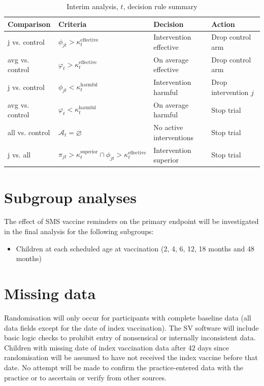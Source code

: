 \documentclass[
  bibliography=totoc]{scrreprt}
\providecommand{\tightlist}{%
  \setlength{\itemsep}{0pt}\setlength{\parskip}{0pt}}
\begin{document}
\begin{table}[H]

\caption{\label{tab:decrules}Interim analysis, $t$, decision rule summary}
\centering
\fontsize{10}{12}\selectfont
\begin{tabular}[t]{llll}
\toprule
Comparison & Criteria & Decision & Action\\
\midrule
j vs. control & $\phi_{jt}>\kappa_t^{\text{effective}}$ & Intervention effective & Drop control arm\\
avg vs. control & $\varphi_t > \kappa_t^{\text{effective}}$ & On average effective & Drop control arm\\
j vs. control & $\phi_{jt}<\kappa_t^{\text{harmful}}$ & Intervention harmful & Drop intervention $j$\\
avg vs. control & $\varphi_t < \kappa_t^{\text{harmful}}$ & On average harmful & Stop trial\\
all vs. control & $\mathcal{A}_t=\varnothing$ & No active interventions & Stop trial\\
j vs. all & $\pi_{jt}>\kappa_t^{\text{superior}} \cap \phi_{jt}>\kappa_t^{\text{effective}}$ & Intervention superior & Stop trial\\
\bottomrule
\end{tabular}
\end{table}

\hypertarget{subgroup-analyses}{%
\section{Subgroup analyses}\label{subgroup-analyses}}

The effect of SMS vaccine reminders on the primary endpoint will be investigated in the final analysis for the following subgroups:

\begin{itemize}
\tightlist
\item
  Children at each scheduled age at vaccination (2, 4, 6, 12, 18 months and 48 months)
\end{itemize}

\hypertarget{missing-data}{%
\section{Missing data}\label{missing-data}}

Randomisation will only occur for participants with complete baseline data (all data fields except for the date of index vaccination).
The SV software will include basic logic checks to prohibit entry of nonsensical or internally inconsistent data.
Children with missing date of index vaccination data after 42 days since randomisation will be assumed to have not received the index vaccine before that date.
No attempt will be made to confirm the practice-entered data with the practice or to ascertain or verify from other sources.
\end{document}
